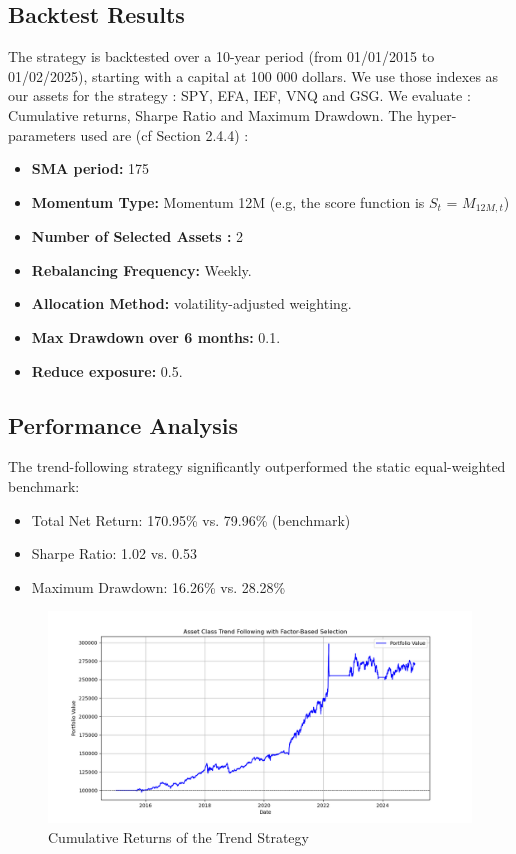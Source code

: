 \documentclass[11pt, oneside, a4paper, titlepage]{report}
\begin{document}
\subsection{Backtest Results}
The strategy is backtested over a 10-year period (from 01/01/2015 to 01/02/2025), starting with a capital at 100 000 dollars. We use those indexes as our assets for the strategy : SPY, EFA, IEF, VNQ and GSG. We evaluate : Cumulative returns, Sharpe Ratio and Maximum Drawdown. The hyper-parameters used are (cf Section 2.4.4) :
\begin{itemize}
    \item 	\textbf{SMA period:} 175
    \item 	\textbf{Momentum Type:} Momentum 12M (e.g, the score function is $S_t$ = $M_{12M,t}$)
    \item 	\textbf{Number of Selected Assets :} 2
    \item 	\textbf{Rebalancing Frequency:} Weekly.
    \item 	\textbf{Allocation Method:} volatility-adjusted weighting.
    \item 	\textbf{Max Drawdown over 6 months:} 0.1.
    \item 	\textbf{Reduce exposure:} 0.5.
\end{itemize}



\subsection{Performance Analysis}

The trend-following strategy significantly outperformed the static equal-weighted benchmark:
\begin{itemize}
    \item Total Net Return: 170.95\% vs. 79.96\% (benchmark)
    \item Sharpe Ratio: 1.02 vs. 0.53
    \item Maximum Drawdown: 16.26\% vs. 28.28\%
\end{itemize}

\begin{figure}[H]
    \centering
    \includegraphics[width=1.2\textwidth]{asset_trend_post_cost.png}
    \caption{Cumulative Returns of the Trend Strategy}
\end{figure}
\end{document}
